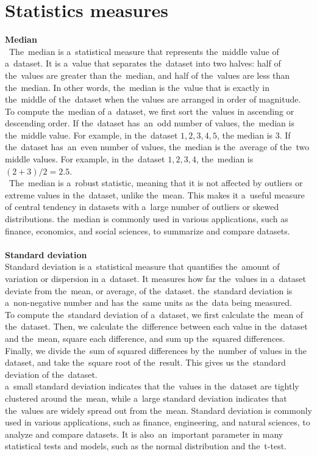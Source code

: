     \section{Statistics measures} \label{subsec:statistics}
    \textbf{Median}\\
   ~The~median is a~statistical measure that represents the~middle value of a~dataset. It is a~value that separates
    the~dataset into two halves: half of the~values are greater than the~median, and half of the~values are less than
    the~median. In other words, the~median is the~value that is exactly in the~middle of the~dataset when the
    values are arranged in order of magnitude.
    \\
    To compute the~median of a~dataset, we first sort the~values in ascending or descending order. If the~dataset
    has~an~odd number of values, the~median is the~middle value. For example, in the~dataset ${1, 2, 3, 4, 5}$, the
    median is $3$. If the~dataset has~an~even number of values, the~median is the~average of the~two middle values.
    For example, in the~dataset ${1, 2, 3, 4}$, the~median is $(2 + 3) / 2 = 2.5$.
    \\
   ~The~median is a~robust statistic, meaning that it is not affected by outliers or extreme values in the~dataset,
    unlike the~mean. This makes it a~useful measure of central tendency in datasets with a~large number of outliers or
    skewed distributions. the~median is commonly used in various applications, such as finance, economics, and social
    sciences, to summarize and compare datasets.\\
    \\
    \textbf{Standard deviation}\\
    Standard deviation is a~statistical measure that quantifies the~amount of variation or dispersion in a~dataset.
    It measures how far the~values in a~dataset deviate from the~mean, or average, of the~dataset. the~standard
    deviation is a~non-negative number and has the~same units as the~data being measured.
    \\
    To compute the~standard deviation of a~dataset, we first calculate the~mean of the~dataset.
    Then, we calculate the~difference between each value in the~dataset and the~mean, square each difference, and
    sum up the~squared differences. Finally, we divide the~sum of squared differences by the~number of values in the
    dataset, and take the~square root of the~result. This gives us the~standard deviation of the~dataset.
    \\
    a~small standard deviation indicates that the~values in the~dataset are tightly clustered around the~mean,
    while a~large standard deviation indicates that the~values are widely spread out from the~mean. Standard
    deviation is commonly used in various applications, such as finance, engineering, and natural sciences, to
    analyze and compare datasets. It is also~an~important parameter in many statistical tests and models, such as the
    normal distribution and the~t-test.

